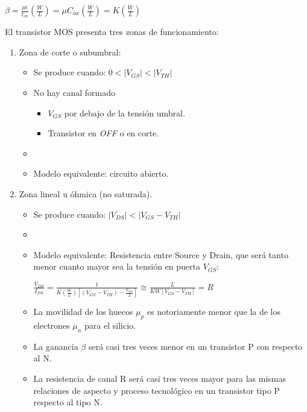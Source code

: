 \documentclass[oneside]{book}
\numberwithin{equation}{section}
\numberwithin{figure}{section}
\numberwithin{table}{section}
\begin{document}
				\begin{center}
					$\displaystyle \beta=\frac{\mu \epsilon}{t_{ox}}\left(\frac{W}{L}\right)=\mu C_{ox}\left(\frac{W}{L}\right)=K\left(\frac{W}{L}\right)$\\
				\end{center}				
				
				El transistor MOS presenta tres zonas de funcionamiento:\\
				
				\begin{enumerate}
					\item Zona de corte o subumbral:
						\begin{itemize}
							\item Se produce cuando: $0<|V_{GS}|<|V_{TH}|$
							\item No hay canal formado
								\begin{itemize}
									\item $V_{GS}$ por debajo de la tensión umbral.
									\item Transistor en \textit{OFF} o en corte. 
								\end{itemize}
							\item {}
							\item Modelo equivalente: circuito abierto.
						\end{itemize}
					\item Zona lineal u óhmica (no saturada).
						\begin{itemize}
							\item Se produce cuando: $|V_{DS}|<|V_{GS}-V_{TH}|$
							\item {}
							\item Modelo equivalente: Resistencia entre Source y Drain, que será tanto menor cuanto mayor sea la tensión en puerta $V_{GS}$:
								\begin{center}
									$\displaystyle \frac{V_{DS}}{I_{DS}}=\frac{1}{K\left(\frac{W}{L}\right)\left[(V_{GS}-V_{TH})-\frac{V_{DS}}{2}\right]} \cong \frac{L}{KW\left[V_{GS}-V_{TH}\right]}=R$
								\end{center}
							\item La movilidad de los huecos $\mu_p$ es notoriamente menor que la de los electrones $\mu_n$ para el silicio. 
							\item La ganancia $\beta$ será casi tres veces menor en un transistor P con respecto al N.
							\item La resistencia de canal R será casi tres veces mayor para las mismas relaciones de aspecto y proceso tecnológico en un transistor tipo P respecto al tipo N.

\end{itemize}
\end{enumerate}
\end{document}
